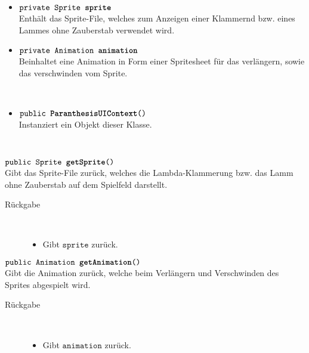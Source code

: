 \begin{description}
\item[Beschreibung] \hfill \\ 
\item[Attribute] \hfill \\
	\vspace{-.8cm}
	\begin{itemize}	
		\item $\texttt{private Sprite \textbf{sprite}}$ \\ Enthält das Sprite-File, welches zum Anzeigen einer Klammernd bzw. eines Lammes ohne Zauberstab verwendet wird.
		\item $\texttt{private Animation \textbf{animation}}$ \\ Beinhaltet eine Animation in Form einer Spritesheet für das verlängern, sowie das verschwinden vom Sprite.
		\end{itemize}
	
\item[Konstruktoren] \hfill \\
	\vspace{-.8cm}
	\begin{itemize}
		\item $\texttt{public \textbf{ParanthesisUIContext}()}$ \\ Instanziert ein Objekt dieser Klasse.

	\end{itemize}
	
\item[Methoden] \hfill \\
	\vspace{-.8cm}
		\item $\texttt{public Sprite \textbf{getSprite}()}$ \\ Gibt das Sprite-File zurück, welches die Lambda-Klammerung bzw. das Lamm ohne Zauberstab auf dem Spielfeld darstellt.
		\begin{description}
			\item[Rückgabe] \hfill \\
			\vspace{-.8cm}
			\begin{itemize}
				\item Gibt $\texttt{sprite}$ zurück.
			\end{itemize}
			\end{description}
			
		\item $\texttt{public Animation \textbf{getAnimation}()}$ \\ Gibt die Animation zurück, welche beim Verlängern und Verschwinden des Sprites abgespielt wird.
		\begin{description}
			\item[Rückgabe] \hfill \\
			\vspace{-.8cm}
			\begin{itemize}
				\item Gibt $\texttt{animation}$ zurück.
			\end{itemize}
			\end{description}
			
		
	\end{description}
			

